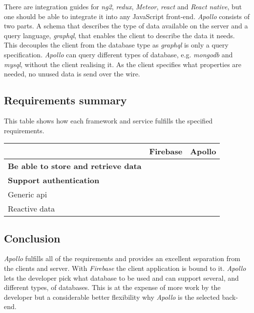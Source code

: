 There are integration guides for \textit{\gls{ng2}}, \textit{\gls{redux}}, \textit{Meteor}, \textit{\gls{react}} and \textit{React native}, but one should be able to integrate it into any JavaScript front-end.
\textit{Apollo} consists of two parts. 
A schema that describes the type of data available on the server and a query language, \textit{\gls{graphql}}, that enables the client to describe the data it needs. 
This decouples the client from the database type as \textit{\gls{graphql}} is only a query specification.
\textit{Apollo} can query different types of database, e.g. \textit{\gls{mongodb}} and \textit{\gls{mysql}}, without the client realising it.
As the client specifies what properties are needed, no unused data is send over the wire.

\subsection*{Requirements summary}
This table shows how each framework and service fulfills the specified requirements.
	
	\begin{tabularx}{\textwidth}{|l|C C|}
	\hline 
	 & Firebase & Apollo \\ 
	\hline 
	\textbf{Be able to store and retrieve data} & \cmark & \cmark \\ 
	\hline
	\textbf{Support authentication} & \cmark & \cmark \\ 
	\hline 
	Generic \gls{api} & \xmark & \cmark \\ 
	\hline 
	Reactive data & \cmark & \cmark \\ 
	\hline 	
	\end{tabularx} 
	
\subsection*{Conclusion}
\textit{Apollo} fulfills all of the requirements and provides an excellent separation from the clients and server.
With \textit{Firebase} the client application is bound to it. 
\textit{Apollo} lets the developer pick what database to be used and can support several, and different types, of databases. 
This is at the expense of more work by the developer but a considerable better flexibility why \textit{Apollo} is the selected back-end.
